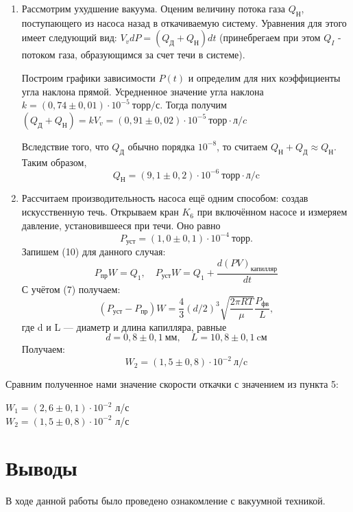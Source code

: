 \documentclass[12pt,a4paper]{article}
\begin{document}
\begin{enumerate}
    
    
\item Рассмотрим ухудшение вакуума. Оценим величину потока газа $Q_Н$, поступающего из насоса назад в откачиваемую систему. Уравнения для этого имеет следующий вид: $V_vdP = (Q_Д + Q_Н) dt$ (принебрегаем при этом $Q_I$ - потоком газа, образующимся за счет течи в системе).



Построим графики зависимости $P(t)$ и определим для них коэффициенты угла наклона прямой. Усредненное значение угла наклона $ k=(0,74 \pm 0,01) \cdot 10^{-5}~торр/с$. Тогда получим $(Q_Д + Q_Н) = kV_v = (0,91 \pm 0,02) \cdot 10^{-5} ~торр \cdot л/c $


Вследствие того, что $Q_\text{Д}$ обычно порядка $10^{-8}$, то  считаем $Q_\text{Н} + Q_\text{Д} \approx Q_\text{Н}$. Таким образом,
	$$Q_\text{Н} = (9,1 \pm 0,2)\cdot 10^{-6} ~\text{торр}\cdot\text{л/c}$$
	\item
	Рассчитаем производительность насоса ещё одним способом: создав искусственную течь. Открываем кран $K_6$ при включённом  насосе и измеряем давление, установившееся при течи. Оно равно $$P_\text{уст} = (1,0\pm 0,1) \cdot 10^{-4} ~\text{торр}.$$
	Запишем (10) для данного случая:
		$$P_\text{пр}W = Q_1, \quad P_\text{уст}W = Q_1 + \frac{d(PV)_\text{капилляр}}{dt}$$
	С учётом (7) получаем:
	$$(P_\text{уст} - P_\text{пр})W = \frac{4}{3}(d/2)^3\sqrt{\frac{2\pi RT}{\mu}}\frac{P_\text{фв}}{L},$$
	где d и L --- диаметр и длина капилляра, равные
	$$d = 0,8\pm 0,1 ~\text{мм},\quad L = 10,8\pm 0,1 ~\text{cм}$$
	Получаем:
	$$W_2 = (1,5\pm 0,8) \cdot 10^{-2} ~\text{л/c}$$
\end{enumerate}
Сравним полученное нами значение скорости откачки с значением из пункта 5:

\begin{center}
$W_1 = (2,6 \pm 0,1) \cdot 10^{-2}$ л/с\\
$W_2 = (1,5 \pm 0,8) \cdot 10^{-2}$ л/с
\end{center}

\section{Выводы}

В ходе данной работы было проведено ознакомление с вакуумной техникой.
\end{document}

